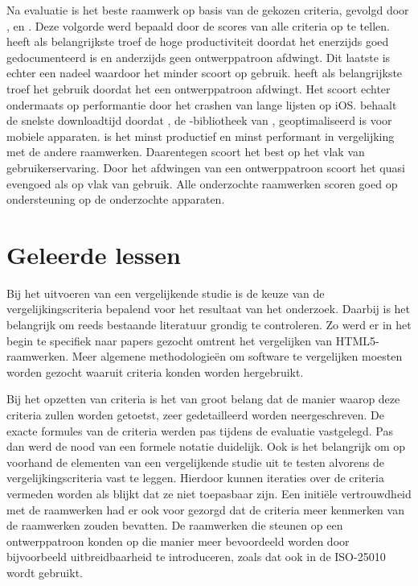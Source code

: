 Na evaluatie is \jqm{} het beste raamwerk op basis van de gekozen criteria, gevolgd door \kendo{}, \lungo{} en \st{}.
Deze volgorde werd bepaald door de scores van alle criteria op te tellen.
\jqm{} heeft als belangrijkste troef de hoge productiviteit doordat het enerzijds goed gedocumenteerd is en anderzijds geen ontwerppatroon afdwingt.
Dit laatste is echter een nadeel waardoor het minder scoort op gebruik.
\kendo{} heeft als belangrijkste troef het gebruik doordat het een ontwerppatroon afdwingt.
Het scoort echter ondermaats op performantie door het crashen van lange lijsten op iOS.
\lungo{} behaalt de snelste downloadtijd doordat  \quo{}, de \js{}-bibliotheek van \lungo{},  geoptimaliseerd is voor mobiele apparaten.\st{} is het minst productief en minst performant in vergelijking met de andere raamwerken.
Daarentegen scoort \st{} het best op het vlak van gebruikerservaring.
Door het afdwingen van een ontwerppatroon scoort het quasi evengoed als \kendo{} op vlak van gebruik.
Alle onderzochte raamwerken scoren goed op ondersteuning op de onderzochte apparaten.


\section{Geleerde lessen} %
Bij het uitvoeren van een vergelijkende studie is de keuze van de vergelijkingscriteria bepalend voor het resultaat van het onderzoek.
Daarbij is het belangrijk om reeds bestaande literatuur grondig te controleren.
Zo werd er in het begin te specifiek naar papers gezocht omtrent het vergelijken van HTML5-raamwerken.
Meer algemene methodologieën om software te vergelijken moesten worden gezocht waaruit criteria konden worden hergebruikt.

Bij het opzetten van criteria is het van groot belang dat de manier waarop deze criteria zullen worden getoetst, zeer gedetailleerd worden neergeschreven.
De exacte formules van de criteria werden pas tijdens de evaluatie vastgelegd.
Pas dan werd de nood van een formele notatie duidelijk.
Ook is het belangrijk om op voorhand de elementen van een vergelijkende studie uit te testen alvorens de vergelijkingscriteria vast te leggen.
Hierdoor kunnen iteraties over de criteria vermeden worden als blijkt dat ze niet toepasbaar zijn.
Een initiële vertrouwdheid met de raamwerken had er ook voor gezorgd dat de criteria meer kenmerken van de raamwerken zouden bevatten.
De raamwerken die steunen op een ontwerppatroon konden op die manier meer bevoordeeld worden door bijvoorbeeld uitbreidbaarheid te introduceren, zoals dat ook in de ISO-25010 wordt gebruikt.

